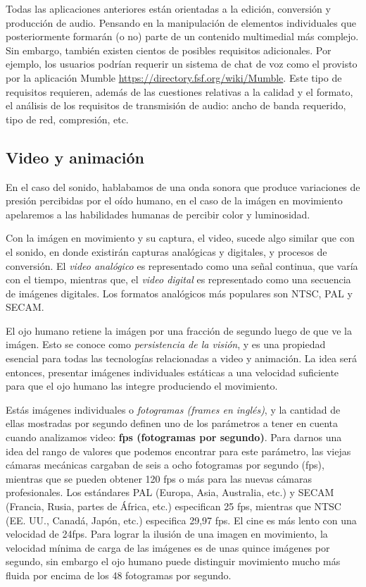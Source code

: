 \documentclass[12pt]{article}
\begin{document}
Todas las aplicaciones anteriores están orientadas a la edición, conversión 
y producción de audio. Pensando en la manipulación de elementos individuales
que posteriormente formarán (o no) parte de un contenido multimedial más 
complejo. Sin embargo, también existen cientos de posibles requisitos adicionales.
Por ejemplo, los usuarios podrían requerir un sistema de chat de voz como 
el provisto por la aplicación Mumble \url{https://directory.fsf.org/wiki/Mumble}. 
Este tipo de requisitos requieren, además de las cuestiones relativas a la calidad
y el formato, el análisis de los requisitos de transmisión de audio: ancho de banda 
requerido, tipo de red, compresión, etc. 

\subsection*{Video y animación}
En el caso del sonido, hablabamos de una onda sonora
que produce variaciones de presión percibidas por el oído humano, en el caso 
de la imágen en movimiento apelaremos a las habilidades humanas de 
percibir color y luminosidad.  

Con la imágen en movimiento y su captura, el video, sucede algo similar que con 
el sonido, en donde existirán capturas analógicas y digitales, y procesos 
de conversión. El {\it video analógico} es representado como una señal continua, que varía con 
el tiempo, mientras que, el {\it video digital} es representado como una secuencia 
de imágenes digitales. Los formatos analógicos más populares son NTSC, PAL y SECAM.  

El ojo humano retiene la imágen por una fracción de segundo luego de 
que ve la imágen. Esto se conoce como {\it persistencia de la visión}, y es 
una propiedad esencial para todas las tecnologías relacionadas a video y 
animación. La idea será entonces, presentar imágenes individuales estáticas
a una velocidad suficiente para que el ojo humano las integre produciendo 
el movimiento. 

Estás imágenes individuales o {\it fotogramas (frames en inglés)}, y la 
cantidad de ellas mostradas por segundo definen uno de los parámetros a 
tener en cuenta cuando analizamos video: {\bf fps (fotogramas por segundo)}. 
Para darnos una idea del rango de valores que podemos encontrar para 
este parámetro, las viejas cámaras mecánicas cargaban de seis a ocho 
fotogramas por segundo (fps), mientras que se pueden obtener 120 fps o más para 
las nuevas cámaras profesionales. Los estándares PAL (Europa, Asia, Australia, 
etc.) y SECAM (Francia, Rusia, partes de África, etc.) especifican 25 fps, 
mientras que NTSC (EE. UU., Canadá, Japón, etc.) especifica 29,97 fps. El cine 
es más lento con una velocidad de 24fps. Para lograr la ilusión de una 
imagen en movimiento, la velocidad mínima de carga de las imágenes es de unas 
quince imágenes por segundo, sin embargo el ojo humano puede distinguir 
movimiento mucho más fluida por encima de los 48 fotogramas por segundo.
\end{document}
